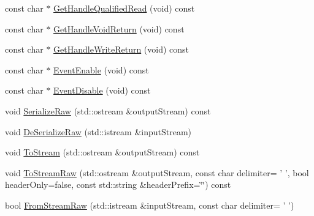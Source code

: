 \begin{DoxyCompactItemize}
const char $\ast$ \hyperlink{classmts_socket_proxy_init_data_a5ab57f3953b6de091c63a6ca9938fd7c}{Get\-Handle\-Qualified\-Read} (void) const 
\item 
const char $\ast$ \hyperlink{classmts_socket_proxy_init_data_a10997a33db140659d5342fa54a48c00f}{Get\-Handle\-Void\-Return} (void) const 
\item 
const char $\ast$ \hyperlink{classmts_socket_proxy_init_data_a275725fed4887b78a0aba466a968787c}{Get\-Handle\-Write\-Return} (void) const 
\item 
const char $\ast$ \hyperlink{classmts_socket_proxy_init_data_aec3c11f0166ba71ae93e0d6edc0bf898}{Event\-Enable} (void) const 
\item 
const char $\ast$ \hyperlink{classmts_socket_proxy_init_data_af80950fab397fcf91d036e3d6c339815}{Event\-Disable} (void) const 
\item 
void \hyperlink{classmts_socket_proxy_init_data_a6cf2b40afbe5a48d2103fda46168481f}{Serialize\-Raw} (std\-::ostream \&output\-Stream) const 
\item 
void \hyperlink{classmts_socket_proxy_init_data_a916a4e3c654ac542f35bb4f195bb228c}{De\-Serialize\-Raw} (std\-::istream \&input\-Stream)
\item 
void \hyperlink{classmts_socket_proxy_init_data_af13c18e35da0807eb3ea8eaa7fb7e55f}{To\-Stream} (std\-::ostream \&output\-Stream) const 
\item 
void \hyperlink{classmts_socket_proxy_init_data_acecfd3e87a2c5845f35cca56371c0e9c}{To\-Stream\-Raw} (std\-::ostream \&output\-Stream, const char delimiter= ' ', bool header\-Only=false, const std\-::string \&header\-Prefix=\char`\"{}\char`\"{}) const 
\item 
bool \hyperlink{classmts_socket_proxy_init_data_a1455ba4dca0957c8712a42e0a7b00809}{From\-Stream\-Raw} (std\-::istream \&input\-Stream, const char delimiter= ' ')
\end{DoxyCompactItemize}


